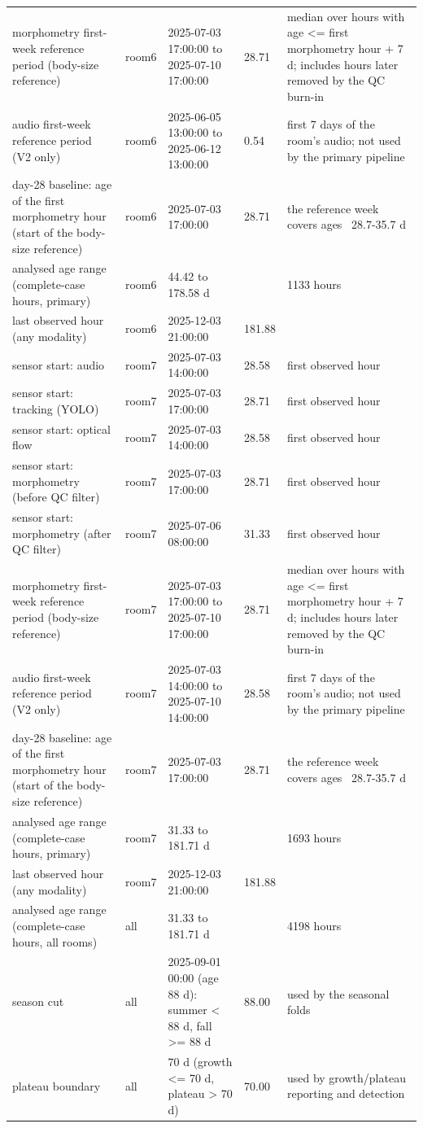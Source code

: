 \begin{tabular}{lllll}
morphometry first-week reference period (body-size reference) & room6 & 2025-07-03 17:00:00 to 2025-07-10 17:00:00 & 28.71 & median over hours with age <= first morphometry hour + 7 d; includes hours later removed by the QC burn-in \\
audio first-week reference period (V2 only) & room6 & 2025-06-05 13:00:00 to 2025-06-12 13:00:00 & 0.54 & first 7 days of the room's audio; not used by the primary pipeline \\
day-28 baseline: age of the first morphometry hour (start of the body-size reference) & room6 & 2025-07-03 17:00:00 & 28.71 & the reference week covers ages ~28.7-35.7 d \\
analysed age range (complete-case hours, primary) & room6 & 44.42 to 178.58 d &  & 1133 hours \\
last observed hour (any modality) & room6 & 2025-12-03 21:00:00 & 181.88 &  \\
sensor start: audio & room7 & 2025-07-03 14:00:00 & 28.58 & first observed hour \\
sensor start: tracking (YOLO) & room7 & 2025-07-03 17:00:00 & 28.71 & first observed hour \\
sensor start: optical flow & room7 & 2025-07-03 14:00:00 & 28.58 & first observed hour \\
sensor start: morphometry (before QC filter) & room7 & 2025-07-03 17:00:00 & 28.71 & first observed hour \\
sensor start: morphometry (after QC filter) & room7 & 2025-07-06 08:00:00 & 31.33 & first observed hour \\
morphometry first-week reference period (body-size reference) & room7 & 2025-07-03 17:00:00 to 2025-07-10 17:00:00 & 28.71 & median over hours with age <= first morphometry hour + 7 d; includes hours later removed by the QC burn-in \\
audio first-week reference period (V2 only) & room7 & 2025-07-03 14:00:00 to 2025-07-10 14:00:00 & 28.58 & first 7 days of the room's audio; not used by the primary pipeline \\
day-28 baseline: age of the first morphometry hour (start of the body-size reference) & room7 & 2025-07-03 17:00:00 & 28.71 & the reference week covers ages ~28.7-35.7 d \\
analysed age range (complete-case hours, primary) & room7 & 31.33 to 181.71 d &  & 1693 hours \\
last observed hour (any modality) & room7 & 2025-12-03 21:00:00 & 181.88 &  \\
analysed age range (complete-case hours, all rooms) & all & 31.33 to 181.71 d &  & 4198 hours \\
season cut & all & 2025-09-01 00:00 (age 88 d): summer < 88 d, fall >= 88 d & 88.00 & used by the seasonal folds \\
plateau boundary & all & 70 d (growth <= 70 d, plateau > 70 d) & 70.00 & used by growth/plateau reporting and detection \\
\hline
\end{tabular}
